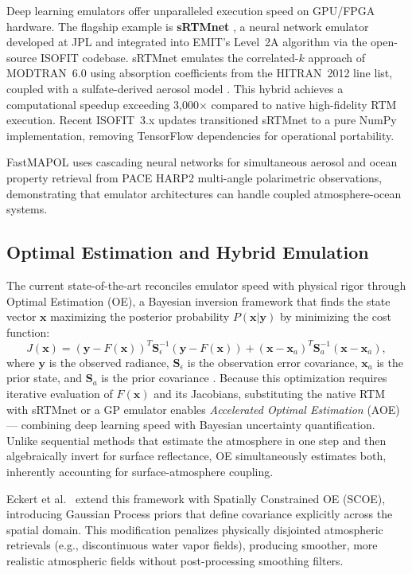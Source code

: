\documentclass[11pt]{report}
\begin{document}
Deep learning emulators offer unparalleled execution speed on GPU/FPGA hardware. The flagship example is \textbf{sRTMnet} \cite{brodrick2021, emit_l2a_atbd}, a neural network emulator developed at JPL and integrated into EMIT's Level~2A algorithm via the open-source ISOFIT codebase. sRTMnet emulates the correlated-$k$ approach of MODTRAN~6.0 using absorption coefficients from the HITRAN~2012 line list, coupled with a sulfate-derived aerosol model \cite{emit_l2a_atbd}. This hybrid achieves a computational speedup exceeding 3,000$\times$ compared to native high-fidelity RTM execution. Recent ISOFIT~3.x updates transitioned sRTMnet to a pure NumPy implementation, removing TensorFlow dependencies for operational portability.

FastMAPOL \cite{gao2023} uses cascading neural networks for simultaneous aerosol and ocean property retrieval from PACE HARP2 multi-angle polarimetric observations, demonstrating that emulator architectures can handle coupled atmosphere-ocean systems.

\subsection{Optimal Estimation and Hybrid Emulation}

The current state-of-the-art reconciles emulator speed with physical rigor through Optimal Estimation (OE), a Bayesian inversion framework that finds the state vector $\mathbf{x}$ maximizing the posterior probability $P(\mathbf{x}|\mathbf{y})$ by minimizing the cost function:
\[
J(\mathbf{x}) = (\mathbf{y} - F(\mathbf{x}))^T \mathbf{S}_\epsilon^{-1} (\mathbf{y} - F(\mathbf{x})) + (\mathbf{x} - \mathbf{x}_a)^T \mathbf{S}_a^{-1} (\mathbf{x} - \mathbf{x}_a),
\]
where $\mathbf{y}$ is the observed radiance, $\mathbf{S}_\epsilon$ is the observation error covariance, $\mathbf{x}_a$ is the prior state, and $\mathbf{S}_a$ is the prior covariance \cite{thompson2018, emit_l2a_atbd}. Because this optimization requires iterative evaluation of $F(\mathbf{x})$ and its Jacobians, substituting the native RTM with sRTMnet or a GP emulator enables \emph{Accelerated Optimal Estimation} (AOE) --- combining deep learning speed with Bayesian uncertainty quantification. Unlike sequential methods that estimate the atmosphere in one step and then algebraically invert for surface reflectance, OE simultaneously estimates both, inherently accounting for surface-atmosphere coupling.

Eckert et al.\ \cite{eckert2024} extend this framework with Spatially Constrained OE (SCOE), introducing Gaussian Process priors that define covariance explicitly across the spatial domain. This modification penalizes physically disjointed atmospheric retrievals (e.g., discontinuous water vapor fields), producing smoother, more realistic atmospheric fields without post-processing smoothing filters.
\end{document}

